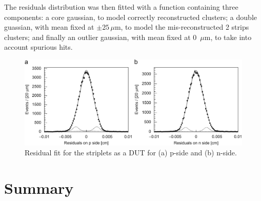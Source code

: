 The residuals distribution was then fitted with a function containing three components: a core 
gaussian, to model correctly reconstructed clusters; a double guassian, with mean fixed at 
$\pm 25\, \mu$m, to model the mis-reconstructed 2 strips clusters; and finally an outlier gaussian, 
with mean fixed at 0~$\mu$m, to take into account spurious hits.

\begin{figure}
\centering
\includegraphics[width=1.0\textwidth]{striplets_residuals.jpg}
\caption{\label{fig:striplets_residuals}Residual fit for the striplets as a DUT for (a) p-side and (b) n-side.}
\end{figure}



 \section{Summary}
